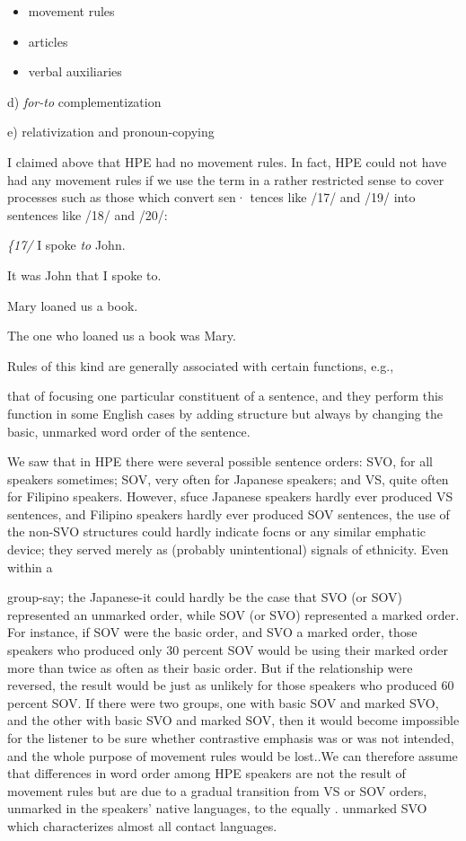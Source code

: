 \begin{itemize}
\item movement rules
\item articles
\item verbal auxiliaries
\end{itemize}

d) \textit{for-to }complementization

e) relativization and pronoun-copying

I claimed above that HPE had no movement rules. In fact, HPE could not have had any movement rules if we use the term in a rather restricted sense to cover processes such as those which convert sen· tences like /17/ and /19/ into sentences like /18/ and /20/:

\textit{\{17}\textit{/ }I spoke \textit{to} John.

\ea\label{ex:18}
 It was John that I spoke to.
\glt
\z

\ea\label{ex:19}
 Mary loaned us a book.
\glt
\z

\ea\label{ex:20}
 The one who loaned us a book was Mary.
\glt
\z

Rules of this kind are generally associated with certain functions, e.g.,


that of focusing one particular constituent of a sentence, and they perform this function in some English cases by adding structure but always by changing the basic, unmarked word order of the sentence.

We saw that in HPE there were several possible sentence orders: SVO, for all speakers sometimes; SOV, very often for Japanese speak\-ers; and VS, quite often for Filipino speakers. However, sfuce Japanese speakers hardly ever produced VS sentences, and Filipino speakers hardly ever produced SOV sentences, the use of the non-SVO structures could hardly indicate focns or any similar emphatic device; they served merely as (probably unintentional) signals of ethnicity. Even within a

group-say; the Japanese-it could hardly be the case that SVO (or SOV) represented an unmarked order, while SOV (or SVO) represented a marked order. For instance, if SOV were the basic order, and SVO a marked order, those speakers who produced only 30 percent SOV would be using their marked order more than twice as often as their basic order. But if the relationship were reversed, the result would be just as unlikely for those speakers who produced 60 percent SOV. If there were two groups, one with basic SOV and marked SVO, and the other with basic SVO and marked SOV, then it would become impossible for the listener to be sure whether contrastive emphasis was or was not intended, and the whole purpose of movement rules would be lost..We can therefore assume that differences in word order among HPE speakers are not the result of movement rules but are due to a gradual transition from VS or SOV orders, unmarked in the speakers' native languages, to the equally . unmarked SVO which characterizes almost all contact languages.

